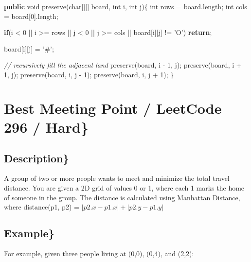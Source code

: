 \documentclass[]{book}
\newenvironment{Shaded}{\begin{snugshade}}{\end{snugshade}}
\newcommand{\CharTok}[1]{\textcolor[rgb]{0.31,0.60,0.02}{#1}}
\newcommand{\CommentTok}[1]{\textcolor[rgb]{0.56,0.35,0.01}{\textit{#1}}}
\newcommand{\DataTypeTok}[1]{\textcolor[rgb]{0.13,0.29,0.53}{#1}}
\newcommand{\DecValTok}[1]{\textcolor[rgb]{0.00,0.00,0.81}{#1}}
\newcommand{\FunctionTok}[1]{\textcolor[rgb]{0.00,0.00,0.00}{#1}}
\newcommand{\KeywordTok}[1]{\textcolor[rgb]{0.13,0.29,0.53}{\textbf{#1}}}
\newcommand{\NormalTok}[1]{#1}
\begin{document}
\begin{Shaded}
\begin{Highlighting}[]
\KeywordTok{public} \DataTypeTok{void} \FunctionTok{preserve}\NormalTok{(}\DataTypeTok{char}\NormalTok{[][] board, }\DataTypeTok{int}\NormalTok{ i, }\DataTypeTok{int}\NormalTok{ j)\{}
    \DataTypeTok{int}\NormalTok{ rows = board.}\FunctionTok{length}\NormalTok{;}
    \DataTypeTok{int}\NormalTok{ cols = board[}\DecValTok{0}\NormalTok{].}\FunctionTok{length}\NormalTok{;}

    \KeywordTok{if}\NormalTok{(i < }\DecValTok{0}\NormalTok{ || i >= rows || j < }\DecValTok{0}\NormalTok{ || j >= cols || board[i][j] != }\CharTok{'O'}\NormalTok{)}
        \KeywordTok{return}\NormalTok{;}

\NormalTok{    board[i][j] = }\CharTok{'#'}\NormalTok{;}

    \CommentTok{// recursively fill the adjacent land}
    \FunctionTok{preserve}\NormalTok{(board, i - }\DecValTok{1}\NormalTok{, j);}
    \FunctionTok{preserve}\NormalTok{(board, i + }\DecValTok{1}\NormalTok{, j);}
    \FunctionTok{preserve}\NormalTok{(board, i, j - }\DecValTok{1}\NormalTok{);}
    \FunctionTok{preserve}\NormalTok{(board, i, j + }\DecValTok{1}\NormalTok{);}
\NormalTok{\}}
\end{Highlighting}
\end{Shaded}

\hypertarget{best-meeting-point-leetcode-296-hard}{%
\section{Best Meeting Point / LeetCode 296 / Hard\}}\label{best-meeting-point-leetcode-296-hard}}

\hypertarget{description-50}{%
\subsection{Description\}}\label{description-50}}

A group of two or more people wants to meet and minimize the total travel distance. You are given a 2D grid of values
0 or 1, where each 1 marks the home of someone in the group. The distance is calculated using Manhattan Distance, where
distance(p1, p2) = \(|p2.x - p1.x| + |p2.y - p1.y|\)

\hypertarget{example-48}{%
\subsection{Example\}}\label{example-48}}

For example, given three people living at (0,0), (0,4), and (2,2):
\end{document}
